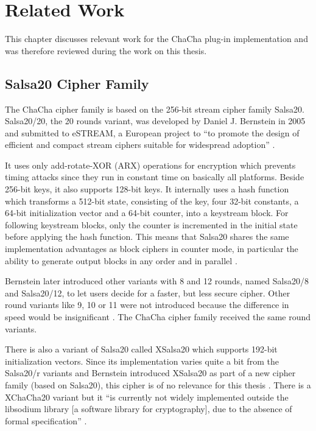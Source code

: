 
\chapter{Related Work}
\label{sec:relatedWork}

This chapter discusses relevant work for the ChaCha plug-in implementation and was therefore reviewed during the work on this thesis.

\section{Salsa20 Cipher Family}
\label{sec:salsaCipher}

The ChaCha cipher family is based on the 256-bit stream cipher family Salsa20.
\noindent
Salsa20/20, the 20 rounds variant, was developed by Daniel J. Bernstein in 2005 \cite{salsaspec} and submitted to eSTREAM, a European project to ``to promote the design of efficient and compact stream ciphers suitable for widespread adoption'' \cite{estream}.

It uses only add-rotate-XOR (ARX) operations for encryption which prevents timing attacks since they run in constant time on basically all platforms. Beside 256-bit keys, it also supports 128-bit keys. It internally uses a hash function which transforms a 512-bit state, consisting of the key, four 32-bit constants, a 64-bit initialization vector and a 64-bit counter, into a keystream block. For following keystream blocks, only the counter is incremented in the initial state before applying the hash function. This means that Salsa20 shares the same implementation advantages as block ciphers in counter mode, in particular the ability to generate output blocks in any order and in parallel \cite{salsaspec}.

Bernstein later introduced other variants with 8 and 12 rounds, named Salsa20/8 and Salsa20/12, to let users decide for a faster, but less secure cipher. Other round variants like 9, 10 or 11 were not introduced because the difference in speed would be insignificant \cite{salsa812}. The ChaCha cipher family received the same round variants. 

There is also a variant of Salsa20 called XSalsa20 which supports 192-bit initialization vectors. Since its implementation varies quite a bit from the Salsa20/r variants and Bernstein introduced XSalsa20 as part of a new cipher family (based on Salsa20), this cipher is of no relevance for this thesis \cite{xsalsa20spec}. There is a XChaCha20 variant but it ``is currently not widely implemented outside the libsodium library [a software library for cryptography], due to the absence of formal specification'' \cite{xchacha20}.

